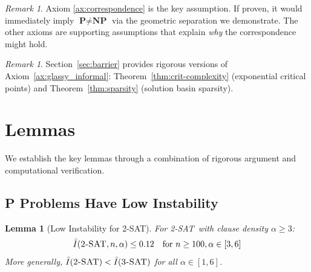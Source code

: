 \documentclass[11pt,a4paper]{article}
\theoremstyle{plain}
\newtheorem{lemma}[theorem]{Lemma}
\theoremstyle{definition}
\theoremstyle{remark}
\newtheorem{remark}[theorem]{Remark}
\newcommand{\Inst}{\bar{I}}
\newcommand{\twoSAT}{\textsc{2-SAT}}
\newcommand{\threeSAT}{\textsc{3-SAT}}
\newcommand{\NP}{\textbf{NP}}
\newcommand{\PP}{\textbf{P}}
\begin{document}
\begin{remark}
Axiom \ref{ax:correspondence} is the key assumption. If proven, it would immediately imply $\PP \neq \NP$ via the geometric separation we demonstrate. The other axioms are supporting assumptions that explain \emph{why} the correspondence might hold.
\end{remark}

\begin{remark}
Section~\ref{sec:barrier} provides rigorous versions of Axiom~\ref{ax:glassy_informal}: Theorem~\ref{thm:crit-complexity} (exponential critical points) and Theorem~\ref{thm:sparsity} (solution basin sparsity).
\end{remark}

\section{Lemmas}

We establish the key lemmas through a combination of rigorous argument and computational verification.

\subsection{P Problems Have Low Instability}

\begin{lemma}[Low Instability for \twoSAT]\label{lem:2sat}
For \twoSAT\ with clause density $\alpha \geq 3$:
\begin{equation}
    \Inst(\twoSAT, n, \alpha) \leq 0.12 \quad \text{for } n \geq 100, \alpha \in [3, 6]
\end{equation}
More generally, $\Inst(\twoSAT) < \Inst(\threeSAT)$ for all $\alpha \in [1, 6]$.
\end{lemma}
\end{document}
